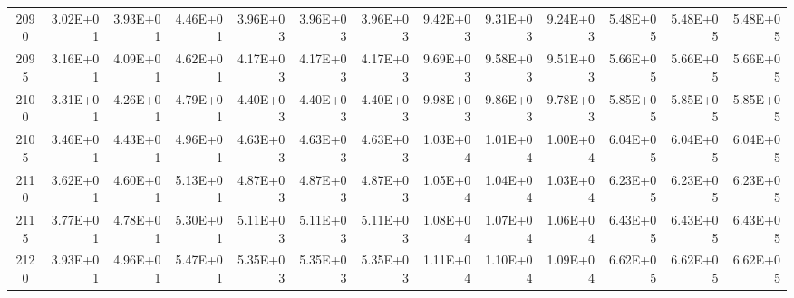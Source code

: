 \documentclass{article}
\begin{document}
\begin{table}
\begin{tabular}{crrr|rrr|rrr|rrr}
2090     & 3.02E+01 & 3.93E+01 & 4.46E+01 & 3.96E+03 & 3.96E+03 & 3.96E+03 & 9.42E+03 & 9.31E+03 & 9.24E+03 & 5.48E+05 & 5.48E+05 & 5.48E+05 \\
2095     & 3.16E+01 & 4.09E+01 & 4.62E+01 & 4.17E+03 & 4.17E+03 & 4.17E+03 & 9.69E+03 & 9.58E+03 & 9.51E+03 & 5.66E+05 & 5.66E+05 & 5.66E+05 \\
2100     & 3.31E+01 & 4.26E+01 & 4.79E+01 & 4.40E+03 & 4.40E+03 & 4.40E+03 & 9.98E+03 & 9.86E+03 & 9.78E+03 & 5.85E+05 & 5.85E+05 & 5.85E+05 \\
2105     & 3.46E+01 & 4.43E+01 & 4.96E+01 & 4.63E+03 & 4.63E+03 & 4.63E+03 & 1.03E+04 & 1.01E+04 & 1.00E+04 & 6.04E+05 & 6.04E+05 & 6.04E+05 \\
2110     & 3.62E+01 & 4.60E+01 & 5.13E+01 & 4.87E+03 & 4.87E+03 & 4.87E+03 & 1.05E+04 & 1.04E+04 & 1.03E+04 & 6.23E+05 & 6.23E+05 & 6.23E+05 \\
2115     & 3.77E+01 & 4.78E+01 & 5.30E+01 & 5.11E+03 & 5.11E+03 & 5.11E+03 & 1.08E+04 & 1.07E+04 & 1.06E+04 & 6.43E+05 & 6.43E+05 & 6.43E+05 \\
2120     & 3.93E+01 & 4.96E+01 & 5.47E+01 & 5.35E+03 & 5.35E+03 & 5.35E+03 & 1.11E+04 & 1.10E+04 & 1.09E+04 & 6.62E+05 & 6.62E+05 & 6.62E+05
\end{tabular}   \end{table}
\end{document}
